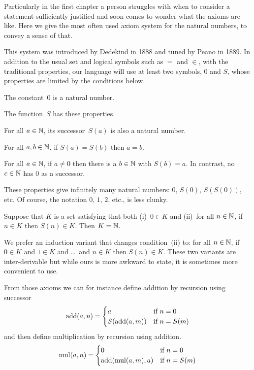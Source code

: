 \documentclass{ibl}
\begin{document}
Particularly in the 
first chapter a person struggles with when to consider a 
statement sufficiently justified 
and soon comes to wonder what the axioms are like.
Here we give the most often used axiom system for the natural numbers, to
convey a sense of that. 

This system was 
introduced by Dedekind in 1888 and tuned by Peano in 1889.
In addition to the usual set and logical symbols such as $=$ and $\in$,
with the traditional properties, 
our language will use at least two symbols, $0$ and $S$, whose 
properties are limited by the conditions below.

\begin{ax}
The constant~$0$ is a natural number.
\end{ax}

\begin{ax}
The  function~$S$ has these properties.
\begin{exes}
\item {} For all $a\in\mathbb{N}$, its successor~$S(a)$ is also 
  a natural number.
\item {} For all $a,b\in\mathbb{N}$, if $S(a)=S(b)$ then $a=b$.
\item {}
  For all $a\in\mathbb{N}$, if $a\neq 0$ then there is a $b\in\mathbb{N}$ with $S(b)=a$.
  In contrast, no $c\in\mathbb{N}$ has $0$ as a successor.  
\end{exes}
\end{ax}


These properties give infinitely many natural numbers:
$0$, $S(0)$, $S(S(0))$, etc.
Of course, the notation $0$, $1$, $2$, etc., is less clunky.

\begin{ax}[Induction]
  Suppose that $K$ is a set satisfying that both (i)~$0\in K$
  and (ii)~for all $n\in\mathbb{N}$, if $n\in K$ then $S(n)\in K$.
  Then $K=\mathbb{N}$.
\end{ax}

We prefer an induction variant that changes
condition~(ii) to: for all $n\in\mathbb{N}$, 
if $0\in K$ and $1\in K$ and \ldots\ and $n\in K$ then $S(n)\in K$.
These two variants are inter-derivable but while ours is 
more awkward to state, it is sometimes more convenient to use.

From those axioms we can for instance 
define addition by recursion using successor
\begin{equation*}
  \operatorname{add}(a,n)=
  \begin{cases}
    a             &\text{if $n=0$}  \\
    S(\operatorname{add}(a,m))  &\text{if $n=S(m)$} 
  \end{cases}
\end{equation*}
and then define multiplication by recursion using addition.
\begin{equation*}
  \operatorname{mul}(a,n)=
  \begin{cases}
    0             &\text{if $n=0$}  \\
    \operatorname{add}(\operatorname{mul}(a,m),a)  &\text{if $n=S(m)$} 
  \end{cases}
\end{equation*}
\end{document}
